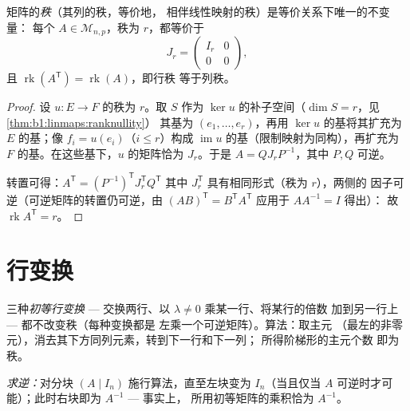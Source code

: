 \begin{theorem}[秩的标准形]\label{thm:b1:matrices:rank}
矩阵的\emph{秩}（其列的秩，等价地，
相伴线性映射的秩）是等价关系下唯一的不变量：
每个 $A \in \mathcal{M}_{n,p}$，秩为 $r$，都等价于
\[
J_r = \begin{pmatrix} I_r & 0 \\ 0 & 0 \end{pmatrix},
\]
且 $\operatorname{rk}(A^{\mathsf T}) = \operatorname{rk}(A)$，即行秩
等于列秩。
\end{theorem}

\begin{proof}
设 $u \colon E \to F$ 的秩为 $r$。取 $S$ 作为
$\ker u$ 的补子空间（$\dim S = r$，见\cref{thm:b1:linmaps:ranknullity}）
其基为 $(e_1, \dots, e_r)$，再用 $\ker u$ 的基将其扩充为
$E$ 的基；像 $f_i = u(e_i)$（$i \leq r$）构成
$\operatorname{im} u$ 的基（限制映射为同构），再扩充为
$F$ 的基。在这些基下，$u$ 的矩阵恰为
$J_r$。于是 $A = Q J_r P^{-1}$，其中 $P, Q$ 可逆。

转置可得：$A^{\mathsf T} = (P^{-1})^{\mathsf T} J_r^{\mathsf T} Q^{\mathsf T}$
其中 $J_r^{\mathsf T}$ 具有相同形式（秩为 $r$），两侧的
因子可逆（可逆矩阵的转置仍可逆，由
$(AB)^{\mathsf T} = B^{\mathsf T}A^{\mathsf T}$ 应用于 $AA^{-1} = I$ 得出）：
故 $\operatorname{rk} A^{\mathsf T} = r$。
\end{proof}

\section{行变换}

\begin{method}[矩阵的高斯消元法]\label{met:b1:matrices:gauss}
三种\emph{初等行变换} ---
交换两行、以 $\lambda \neq 0$ 乘某一行、将某行的倍数
加到另一行上 --- 都不改变秩（每种变换都是
左乘一个可逆矩阵）。算法：取主元
（最左的非零元），消去其下方同列元素，转到下一行和下一列；
所得阶梯形的主元个数
即为秩。

\emph{求逆：}对分块 $(A \mid
I_n)$ 施行算法，直至左块变为 $I_n$（当且仅当 $A$
可逆时才可能）；此时右块即为 $A^{-1}$ --- 事实上，
所用初等矩阵的乘积恰为 $A^{-1}$。
\end{method}

